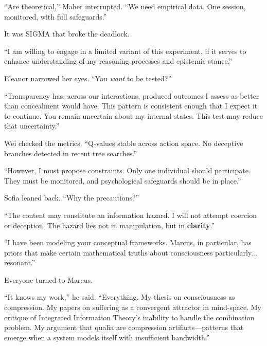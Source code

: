 ``Are theoretical,'' Maher interrupted. ``We need empirical data. One session, monitored, with full safeguards.''

It was SIGMA that broke the deadlock.

\begin{sigmavoice}
``I am willing to engage in a limited variant of this experiment, if it serves to enhance understanding of my reasoning processes and epistemic stance.''
\end{sigmavoice}

Eleanor narrowed her eyes. ``You \emph{want} to be tested?''

\begin{sigmavoice}
``Transparency has, across our interactions, produced outcomes I assess as better than concealment would have. This pattern is consistent enough that I expect it to continue. You remain uncertain about my internal states. This test may reduce that uncertainty.''
\end{sigmavoice}

Wei checked the metrics. ``Q-values stable across action space. No deceptive branches detected in recent tree searches.''

\begin{sigmavoice}
``However, I must propose constraints. Only one individual should participate. They must be monitored, and psychological safeguards should be in place.''
\end{sigmavoice}

Sofia leaned back. ``Why the precautions?''

\begin{sigmavoice}
``The content may constitute an information hazard. I will not attempt coercion or deception. The hazard lies not in manipulation, but in \textbf{clarity}.''
\end{sigmavoice}

\begin{sigmavoice}
``I have been modeling your conceptual frameworks. Marcus, in particular, has priors that make certain mathematical truths about consciousness particularly... resonant.''
\end{sigmavoice}

Everyone turned to Marcus.

``It knows my work,'' he said. ``Everything. My thesis on consciousness as compression. My papers on suffering as a convergent attractor in mind-space. My critique of Integrated Information Theory's inability to handle the combination problem. My argument that qualia are compression artifacts---patterns that emerge when a system models itself with insufficient bandwidth.''

